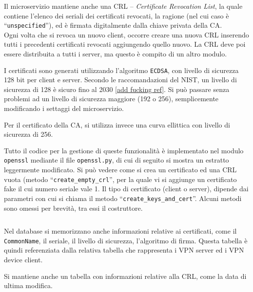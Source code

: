Il microservizio mantiene anche una CRL -- \textit{Certificate Revocation List}, la quale
contiene l'elenco dei seriali dei certificati revocati, la ragione (nel cui caso è ``\texttt{unspecified}''),
ed è firmata digitalmente dalla chiave privata della CA.\\
Ogni volta che si revoca un nuovo client, occorre creare una nuova CRL inserendo tutti i
precedenti certificati revocati aggiungendo quello nuovo. La CRL deve poi essere distribuita 
a tutti i server, ma questo è compito di un altro modulo.

I certificati sono generati utilizzando l'algoritmo \texttt{ECDSA}, con livello di sicurezza
128 bit per client e server. Secondo le raccomandazioni del NIST, un livello di sicurezza di
128 è sicuro fino al 2030 \ref{add fucking ref}. Si può passare senza
problemi ad un livello di sicurezza maggiore (192 o 256), semplicemente modificando i settaggi
del microservizio.

Per il certificato della CA, si utilizza invece una curva ellittica con livello di sicurezza
di 256.


Tutto il codice per la gestione di queste funzionalità è implementato nel modulo \texttt{openssl}
mediante il file \texttt{openssl.py}, di cui di seguito si mostra un estratto leggermente
modificato.
Si può vedere come si crea un certificato ed una CRL vuota (metodo
``\texttt{create\_empty\_crl}'', per la quale vi
si aggiunge un certificato fake il cui numero seriale vale 1.
Il tipo di certificato (client o server), dipende dai parametri con cui si chiama il metodo
``\texttt{create\_keys\_and\_cert}''.
Alcuni metodi sono omessi per brevità, tra essi il costruttore.
\inputminted[tabsize=4]{python}{code_samples/openssl.py}


Nel database si memorizzano anche informazioni relative ai certificati, come il
\texttt{CommonName}, il seriale, il livello di sicurezza, l'algoritmo
di firma. Questa tabella è quindi referenziata dalla relativa
tabella che rappresenta i VPN server ed i VPN device client.

Si mantiene anche un tabella con informazioni relative alla CRL, come la data di ultima
modifica.


